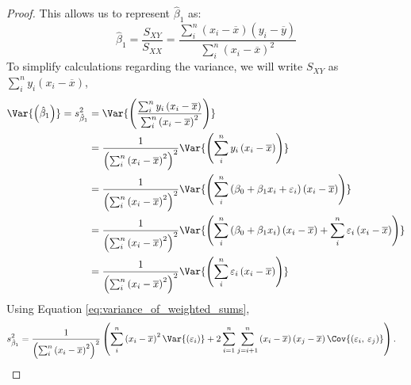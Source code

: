 \documentclass{article}
\begin{document}
\begin{proof}
    This allows us to represent $\hat{\beta}_1$ as:
    \begin{equation*}
        \hat{\beta}_1 = \frac{S_{XY}}{S_{XX}} = \frac{\sum_i^n \left( x_i - \overline{x} \right) \left( y_i - \overline{y} \right)}{\sum_i^n \left( x_i - \overline{x} \right)^2}
    \end{equation*}
    To simplify calculations regarding the variance, we will write $S_{XY}$ as $\sum_i^n y_i \left( x_i - \overline{x} \right)$,
    \begin{align*}
        \Var{\left( \hat{\beta}_1 \right)} = s_{\hat{\beta}_1}^2 & = \Var{\left( \frac{\sum_i^n y_i \left( x_i - \overline{x} \right)}{\sum_i^n \left( x_i - \overline{x} \right)^2} \right)}                                                                                                               \\
                                                                 & = \frac{1}{\left( \sum_i^n \left( x_i - \overline{x} \right)^2 \right)^2} \Var{\left( \sum_i^n y_i \left( x_i - \overline{x} \right) \right)}                                                                                            \\
                                                                 & = \frac{1}{\left( \sum_i^n \left( x_i - \overline{x} \right)^2 \right)^2} \Var{\left( \sum_i^n \left( \beta_0 + \beta_1x_i + \varepsilon_i \right) \left( x_i - \overline{x} \right) \right)}                                            \\
                                                                 & = \frac{1}{\left( \sum_i^n \left( x_i - \overline{x} \right)^2 \right)^2} \Var{\left( \sum_i^n \left( \beta_0 + \beta_1x_i \right) \left( x_i - \overline{x} \right) + \sum_i^n \varepsilon_i \left( x_i - \overline{x} \right) \right)} \\
                                                                 & = \frac{1}{\left( \sum_i^n \left( x_i - \overline{x} \right)^2 \right)^2} \Var{\left( \sum_i^n \varepsilon_i \left( x_i - \overline{x} \right) \right)}
    \end{align*}
    Using Equation \ref{eq:variance_of_weighted_sums},
    \begin{align*}
        s_{\hat{\beta}_1}^2 & = \frac{1}{\left( \sum_i^n \left( x_i - \overline{x} \right)^2 \right)^2} \left( \sum_i^n \left( x_i - \overline{x} \right)^2 \Var{\left( \varepsilon_i \right)} + 2\sum_{i=1}^n\sum_{j=i+1}^n\left( x_i - \overline{x} \right)\left( x_j - \overline{x} \right)\Cov{\left(\varepsilon_i,\: \varepsilon_j\right)} \right).

\end{align*}
\end{proof}
\end{document}
